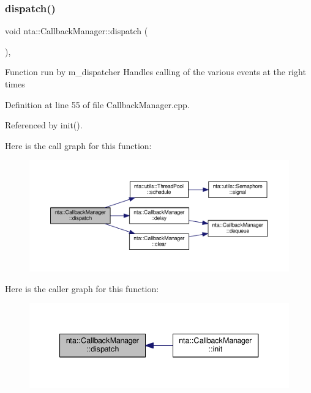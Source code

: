 \subsubsection{\texorpdfstring{dispatch()}{dispatch()}}
{\footnotesize\ttfamily void nta\+::\+Callback\+Manager\+::dispatch (\begin{DoxyParamCaption}{ }\end{DoxyParamCaption})\hspace{0.3cm}{\ttfamily [static]}, {\ttfamily [private]}}

Function run by m\+\_\+dispatcher Handles calling of the various events at the right times 

Definition at line 55 of file Callback\+Manager.\+cpp.



Referenced by init().

Here is the call graph for this function\+:\nopagebreak
\begin{figure}[H]
\begin{center}
\leavevmode
\includegraphics[width=350pt]{d1/de6/classnta_1_1CallbackManager_a7912dc908d7a7a44267ddd8fa6fb8686_cgraph}
\end{center}
\end{figure}
Here is the caller graph for this function\+:\nopagebreak
\begin{figure}[H]
\begin{center}
\leavevmode
\includegraphics[width=340pt]{d1/de6/classnta_1_1CallbackManager_a7912dc908d7a7a44267ddd8fa6fb8686_icgraph}
\end{center}
\end{figure}
\mbox{\label{classnta_1_1CallbackManager_a1fd6132e79e49dbcb787bc8a8507a931}} 

